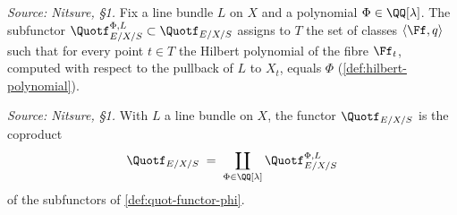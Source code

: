 \begin{definition}
  \label{def:quot-functor-phi}
  \textit{Source: Nitsure, §1.}
  Fix a line bundle $L$ on $X$ and a polynomial $\Phi\in\QQ[\lambda]$. The
  subfunctor $\Quotf_{E/X/S}^{\Phi,L}\subset\Quotf_{E/X/S}$ assigns to $T$ the
  set of classes $\langle\Ff,q\rangle$ such that for every point $t\in T$ the
  Hilbert polynomial of the fibre $\Ff_t$, computed with respect to the pullback
  of $L$ to $X_t$, equals $\Phi$ (\cref{def:hilbert-polynomial}).
\end{definition}

\begin{lemma}
  \label{lem:quot-hilbert-decomposition}
  \textit{Source: Nitsure, §1.}
  With $L$ a line bundle on $X$, the functor $\Quotf_{E/X/S}$ is the coproduct
  \[
    \Quotf_{E/X/S} \;=\; \coprod_{\Phi\in\QQ[\lambda]}\Quotf_{E/X/S}^{\Phi,L}
  \]
  of the subfunctors of \cref{def:quot-functor-phi}.
\end{lemma}

